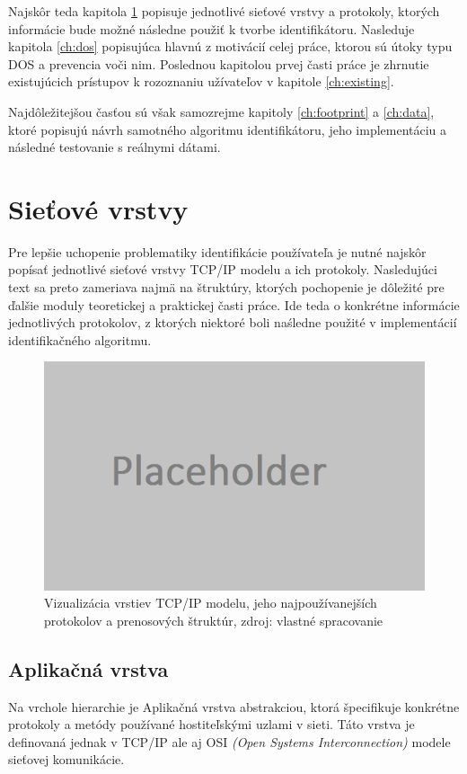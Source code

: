 \documentclass[
  digital, %
  table,   %
  lof,     %
  nolot,   %
  nocover
]{fithesis3}
\begin{document}
Najskôr teda kapitola
\ref{ch:net-layers} popisuje jednotlivé sieťové vrstvy a protokoly, ktorých
informácie bude možné následne použiť k tvorbe identifikátoru. 
Nasleduje kapitola \ref{ch:dos} popisujúca hlavnú z motivácií 
celej práce, ktorou sú útoky typu DOS a prevencia voči nim.
Poslednou kapitolou prvej časti práce je zhrnutie
existujúcich prístupov k rozoznaniu užívateľov v kapitole \ref{ch:existing}.

Najdôležitejšou časťou sú však
samozrejme kapitoly \ref{ch:footprint} a \ref{ch:data}, ktoré popisujú návrh samotného 
algoritmu identifikátoru, jeho implementáciu a následné testovanie s reálnymi dátami.

\chapter{Sieťové vrstvy}
\label{ch:net-layers}
Pre lepšie uchopenie problematiky identifikácie používateľa je nutné najskôr
popísať jednotlivé sieťové vrstvy TCP/IP modelu a
ich protokoly. Nasledujúci text sa preto zameriava najmä na štruktúry, ktorých pochopenie je
dôležité pre ďalšie moduly teoretickej a praktickej časti práce. Ide teda o
konkrétne informácie jednotlivých protokolov, z ktorých niektoré boli naśledne použité v implementácií
identifikačného algoritmu.

\begin{figure}[h]
  \centering
    \includegraphics[width=.80\textwidth]{images/net-layers.png}
  \caption{Vizualizácia vrstiev TCP/IP modelu, jeho najpoužívanejších protokolov
  a prenosových štruktúr, zdroj: vlastné spracovanie}
  \label{fig:net-layers}
\end{figure}

\section{Aplikačná vrstva}
Na vrchole hierarchie je Aplikačná vrstva abstrakciou, ktorá špecifikuje
konkrétne protokoly a metódy používané hostiteľskými uzlami v sieti. Táto
vrstva je definovaná jednak v TCP/IP ale aj OSI
\textit{(Open Systems Interconnection)} modele sieťovej komunikácie.
\end{document}

